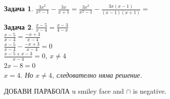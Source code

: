\documentclass{article}
\newtheorem{problem}{Задача}
\begin{document}
\begin{problem}
	$\frac{3x^2	}{x^2-1} - \frac{3x}{x+1} = \frac{3x^2	}{x^2-1} -\frac{3x(x-1)	}{(x-1)(x+1)} = $
\end{problem}



\begin{problem}
	$\frac{x-5}{x-4} = \frac{x-3}{4-x}$ \\	
	$\frac{x-5}{x-4} = \frac{-x+3}{x-4}$\\	
	$\frac{x-5}{x-4} - \frac{-x+3}{x-4} = 0$\\	
	$\frac{x-5 +x-3}{x-4}  = 0$, $x \neq 4 $ \\
	$2x - 8 = 0 $ \\
	$ x  = 4$. Но  $x \neq 4 $, следователно няма решение.
\end{problem}

ДОБАВИ ПАРАБОЛА u smiley face and $\cap$ is negative.  
\end{document}
